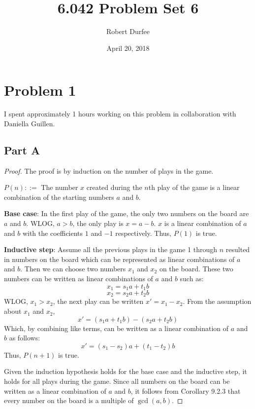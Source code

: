 \documentclass{article}
\title{ 6.042 Problem Set 6 }
\author{ Robert Durfee }
\date{ April 20, 2018 }
\begin{document}
\maketitle

\section*{Problem 1}

I spent approximately 1 hours working on this problem in collaboration with
Daniella Guillen.

\subsection*{Part A}

\begin{proof}
  The proof is by induction on the number of plays in the game.
  \begin{center}
    $P(n) ::=$ The number $x$ created during the $n$th play of the game is a
    linear combination of the starting numbers $a$ and $b$.
  \end{center}

  \noindent\textbf{Base case}: In the first play of the game, the only two numbers on the
  board are $a$ and $b$. WLOG, $a > b$, the only play is $x = a - b$.
  $x$ is a linear combination of $a$ and $b$ with the coefficients $1$ and $-1$
  respectively. Thus, $P(1)$ is true.

  \bigbreak

  \noindent\textbf{Inductive step}: Assume all the previous plays in the game 1 through
  $n$ resulted in numbers on the board which can be represented as linear
  combinations of $a$ and $b$. Then we can choose two numbers $x_1$ and $x_2$ on
  the board. These two numbers can be written as linear combinations of $a$ and
  $b$ such as:
  $$ x_1 = s_1 a + t_1 b $$
  $$ x_2 = s_2 a + t_2 b $$
  WLOG, $x_1 > x_2$, the next play can be written $x' = x_1 - x_2$. From the
  assumption about $x_1$ and $x_2$, 
  $$ x' = \left(s_1 a + t_1 b\right) - \left(s_2 a + t_2 b\right) $$
  Which, by combining like terms, can be written as a linear combination of $a$
  and $b$ as follows:
  $$ x' = \left(s_1 - s_2\right)a + \left(t_1 - t_2\right)b $$
  Thus, $P(n + 1)$ is true.

  \bigbreak

  Given the induction hypothesis holds for the base case and the inductive step,
  it holds for all plays during the game. Since all numbers on the board can be
  written as a linear combination of $a$ and $b$, it follows from Corollary
  9.2.3 that every number on the board is a multiple of $\gcd(a, b)$.
 
\end{proof}
\end{document}
